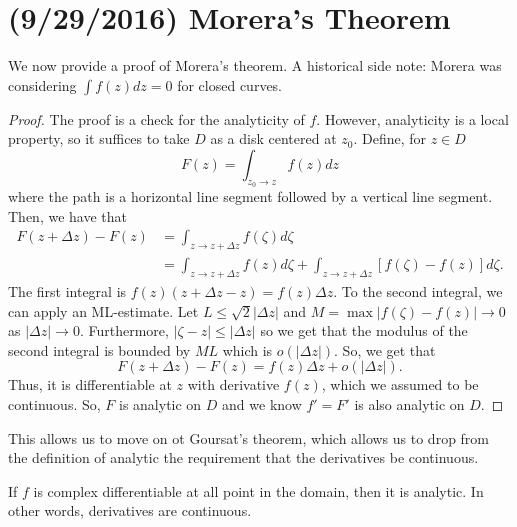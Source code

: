 \documentclass[11pt,leqno,oneside]{amsart}
\begin{document}
  \section{(9/29/2016) Morera's Theorem}
  We now provide a proof of Morera's theorem. A historical side note:
  Morera was considering $\int f(z)dz = 0$ for closed curves.
  \begin{proof}
    The proof is a check for the analyticity of $f$. However,
    analyticity is a local property, so it suffices to take $D$ as a
    disk centered at $z_0$. Define, for $z \in D$ \[
      F(z) = \int_{z_0 \to z} f(z)dz
    \]
    where the path is a horizontal line segment followed by a vertical
    line segment. Then, we have that
    \begin{align*}
      F(z+\Delta z) - F(z) & = \int_{z \to z+ \Delta z} f(\zeta)
                             d\zeta \\
      \ & = \int_{z \to z+\Delta z} f(z)d\zeta + \int_{z \to z +
          \Delta z} [f(\zeta) - f(z)]d\zeta.
    \end{align*}
    The first integral is $f(z)(z+\Delta z - z) = f(z) \Delta z$. To the
    second integral, we can apply an ML-estimate. Let $L \leq \sqrt{2}
    | \Delta z|$ and $M = \max | f(\zeta) - f(z)| \to 0$ as $|\Delta
    z| \to 0$. Furthermore, $|\zeta - z| \leq |\Delta z|$ so we get
    that the modulus of the second integral is bounded by $ML$ which
    is $o(|\Delta z|)$. So, we get that \[
      F(z+\Delta z) - F(z) = f(z) \Delta z + o(|\Delta z|).
    \]
    Thus, it is differentiable at $z$ with derivative $f(z)$, which we
    assumed to be continuous. So, $F$ is analytic on $D$ and we know
    $f' = F'$ is also analytic on $D$. 
  \end{proof}
  This allows us to move on ot Goursat's theorem, which allows us to
  drop from the definition of analytic the requirement that the
  derivatives be continuous.
  \begin{thm}
    If $f$ is complex differentiable at all point in the domain, then
    it is analytic. In other words, derivatives are continuous.
  \end{thm}
\end{document}
